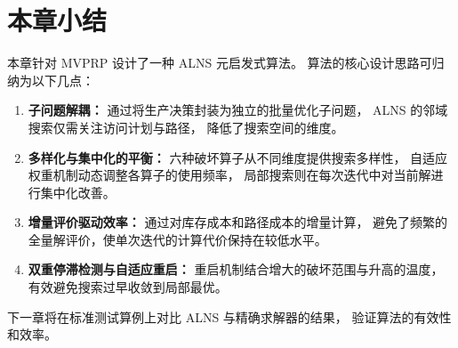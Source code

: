 \documentclass{article}
\begin{document}
\section{本章小结}
\label{sec:alns-summary}

本章针对 MVPRP 设计了一种 ALNS 元启发式算法。
算法的核心设计思路可归纳为以下几点：

\begin{enumerate}
  \item \textbf{子问题解耦：}
    通过将生产决策封装为独立的批量优化子问题，
    ALNS 的邻域搜索仅需关注访问计划与路径，
    降低了搜索空间的维度。

  \item \textbf{多样化与集中化的平衡：}
    六种破坏算子从不同维度提供搜索多样性，
    自适应权重机制动态调整各算子的使用频率，
    局部搜索则在每次迭代中对当前解进行集中化改善。

  \item \textbf{增量评价驱动效率：}
    通过对库存成本和路径成本的增量计算，
    避免了频繁的全量解评价，使单次迭代的计算代价保持在较低水平。

  \item \textbf{双重停滞检测与自适应重启：}
    重启机制结合增大的破坏范围与升高的温度，
    有效避免搜索过早收敛到局部最优。
\end{enumerate}

下一章将在标准测试算例上对比 ALNS 与精确求解器的结果，
验证算法的有效性和效率。
\end{document}
